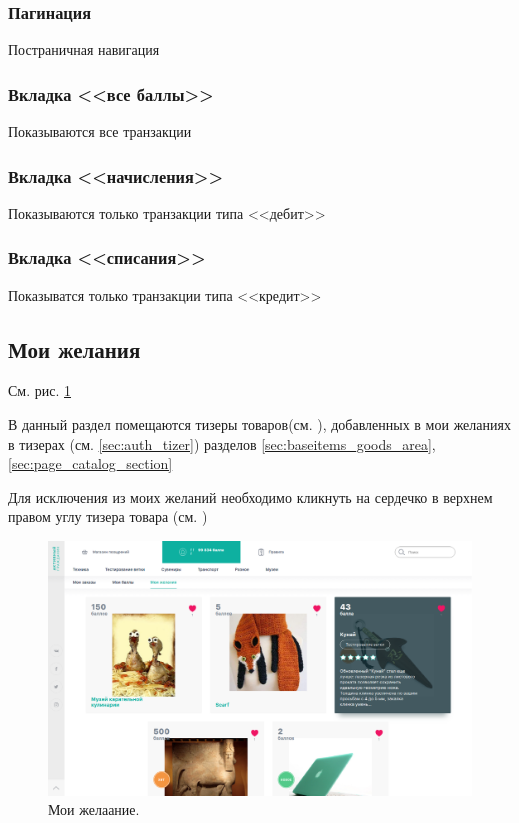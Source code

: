             \subsubsection{Пагинация}
                Постраничная навигация
            
            \subsubsection{Вкладка <<все баллы>>}
                Показываются все транзакции

            \subsubsection{Вкладка <<начисления>>}
                Показываются только транзакции типа <<дебит>>

            \subsubsection{Вкладка <<списания>>}
                Показыватся только транзакции типа <<кредит>>

        \subsection{Мои желания}
            \label{sec:auth_my_wishes}
            См. рис. \ref{fig:auth_my_wishes}

            В данный раздел помещаются тизеры товаров(см. 
            ), добавленных в мои
            желаниях в тизерах (см. \ref{sec:auth_tizer}) разделов 
            \ref{sec:baseitems_goods_area}, \ref{sec:page_catalog_section}

            Для исключения из моих желаний необходимо кликнуть на сердечко в
            верхнем правом углу тизера товара (см. )
        
            \begin{figure}
                \center
                \includegraphics[width=120mm]{04_auth_funcs/figures/15.eps}
                \caption{Мои желаание.}
                \label{fig:auth_my_wishes}
            \end{figure}
        
        
        
